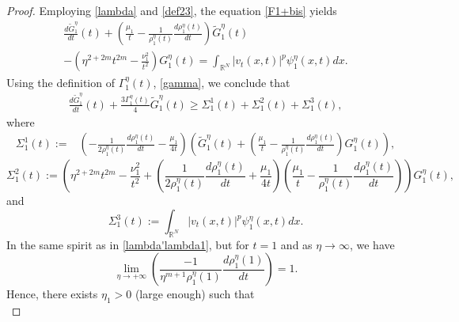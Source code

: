 \documentclass[12pt,leqno]{amsart}
\numberwithin{equation}{section}
\theoremstyle{remark}
\def\R{{\mathbb{R}}}
\def\d{\displaystyle}
\begin{document}
\begin{proof}
Employing  \eqref{lambda} and   \eqref{def23}, the equation  \eqref{F1+bis} yields
\begin{equation}\label{F1+bis2}
\begin{array}{l}
\d \frac{d \tilde{G}^{\eta}_1}{dt}(t)+\left(\frac{\mu_1}{t}-\frac{1}{\rho^{\eta}_1(t)}\frac{d\rho^{\eta}_1(t)}{dt}\right)\tilde{G}^{\eta}_1(t)\\
\d -\left(\eta^{2+2m} t^{2 m}-\frac{\nu_1^2}{t^2}\right)G^{\eta}_1(t) 
\d = \int_{\R^N}|v_t(x,t)|^p\psi^{\eta}_1(x,t)dx.
\end{array}
\end{equation}
Using the definition of $\Gamma_1^{\eta}(t)$, \eqref{gamma},   we conclude that 
\begin{equation}\label{G2+bis3}
\begin{array}{c}
\d \frac{d \tilde{G}^{\eta}_1}{dt}(t)+\frac{3\Gamma_1^{\eta}(t)}{4}\tilde{G}^{\eta}_1(t)\ge\Sigma_1^1(t)+\Sigma_1^2(t)+\Sigma_1^3(t),
\end{array}
\end{equation}
where 
\begin{equation}\label{sigma1-exp}
\begin{array}{rl}
\Sigma_1^1(t):=&\d \left(-\frac{1}{2\rho^{\eta}_1(t)}\frac{d\rho^{\eta}_1(t)}{dt}-\frac{\mu_1}{4t}\right)\left(\tilde{G}^{\eta}_1(t)+\left(\frac{\mu_1}{t}-\frac{1}{\rho^{\eta}_1(t)}\frac{d\rho^{\eta}_1(t)}{dt}\right)G^{\eta}_1(t)\right),
\end{array} 
\end{equation}
\begin{equation}\label{sigma2-exp}
\Sigma_1^2(t):=\d \left(\eta^{2+2m} t^{2 m}-\frac{\nu_1^2}{t^2}+\left(\frac{1}{2\rho^{\eta}_1(t)}\frac{d\rho^{\eta}_1(t)}{dt}+\frac{\mu_1}{4t}\right) \left(\frac{\mu_1}{t}-\frac{1}{\rho^{\eta}_1(t)}\frac{d\rho^{\eta}_1(t)}{dt}\right) \right)  G^{\eta}_1(t),
\end{equation}
and
\begin{equation}\label{sigma3-exp}
\Sigma_1^3(t):=  \int_{\R^N}|v_t(x,t)|^p\psi^{\eta}_1(x,t) dx.
\end{equation}
In the same spirit as in \eqref{lambda'lambda1}, but for $t=1$ and as $\eta \to \infty$, we have
\begin{equation}\label{lambda'lambda2}
\d \lim_{\eta \to +\infty} \left(\frac{-1}{\eta^{m+1}\rho^{\eta}_1(1)}\frac{d\rho^{\eta}_1(1)}{dt}\right)=1.
\end{equation}
Hence, there exists $\eta_1>0$ (large enough) such that
\begin{equation}\label{lambda'lambda3}

\end{equation}
\end{proof}
\end{document}
